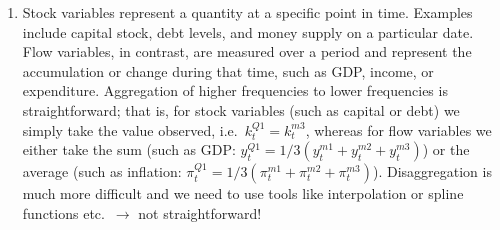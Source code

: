 \begin{enumerate}
\begin{itemize}
    \end{itemize}
\item
Stock variables represent a quantity at a specific point in time. Examples include capital stock, debt levels, and money supply on a particular date.
Flow variables, in contrast, are measured over a period and represent the accumulation or change during that time, such as GDP, income, or expenditure.
Aggregation of higher frequencies to lower frequencies is straightforward;
  that is, for stock variables (such as capital or debt) we simply take the value observed, i.e.\
  \(k_t^{Q1} = k_t^{m3}\),
  whereas for flow variables we either take the sum (such as GDP: \(y_t^{Q1} = 1/3 (y_t^{m1}+y_t^{m2}+y_t^{m3})\))
  or the average (such as inflation: \(\pi_t^{Q1} = 1/3 (\pi_t^{m1}+\pi_t^{m2}+\pi_t^{m3})\)).
Disaggregation is much more difficult and we need to use tools like interpolation or spline functions etc.\
  \(\rightarrow \) not straightforward!
\end{enumerate}